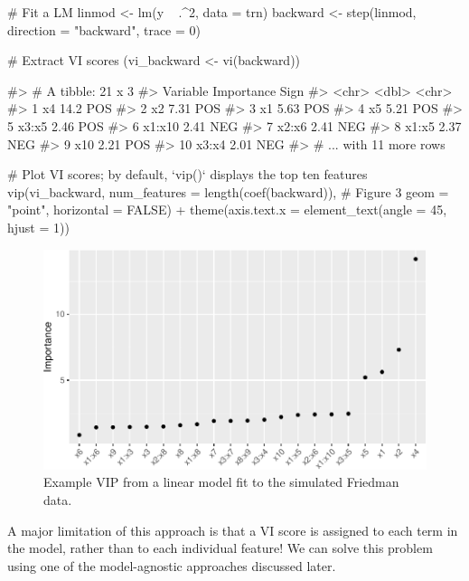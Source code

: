 \begin{Schunk}
\begin{Sinput}
# Fit a LM
linmod <- lm(y ~ .^2, data = trn)
backward <- step(linmod, direction = "backward", trace = 0)

# Extract VI scores
(vi_backward <- vi(backward))
\end{Sinput}
\begin{Soutput}
#> # A tibble: 21 x 3
#>    Variable Importance Sign 
#>    <chr>         <dbl> <chr>
#>  1 x4            14.2  POS  
#>  2 x2             7.31 POS  
#>  3 x1             5.63 POS  
#>  4 x5             5.21 POS  
#>  5 x3:x5          2.46 POS  
#>  6 x1:x10         2.41 NEG  
#>  7 x2:x6          2.41 NEG  
#>  8 x1:x5          2.37 NEG  
#>  9 x10            2.21 POS  
#> 10 x3:x4          2.01 NEG  
#> # ... with 11 more rows
\end{Soutput}
\begin{Sinput}
# Plot VI scores; by default, `vip()` displays the top ten features
vip(vi_backward, num_features = length(coef(backward)),  # Figure 3 
    geom = "point", horizontal = FALSE) +
  theme(axis.text.x = element_text(angle = 45, hjust = 1))
\end{Sinput}
\begin{figure}[!htb]

{\centering \includegraphics[width=0.7\linewidth]{greenwell-boehmke_files/figure-latex/vip-step-1} 

}

\caption[Example VIP from a linear model fit to the simulated Friedman data]{Example VIP from a linear model fit to the simulated Friedman data.}\label{fig:vip-step}
\end{figure}
\end{Schunk}

A major limitation of this approach is that a VI score is assigned to
each term in the model, rather than to each individual feature! We can
solve this problem using one of the model-agnostic approaches discussed
later.

